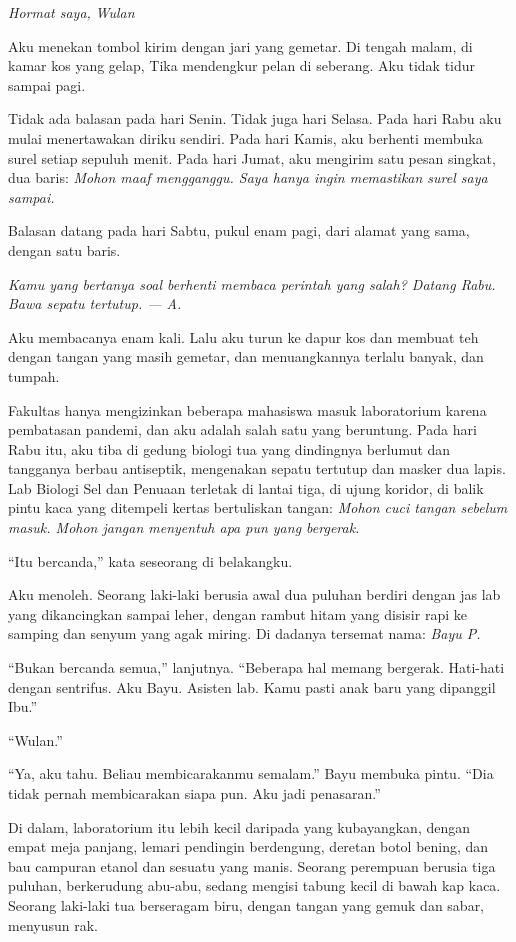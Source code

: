 \documentclass[11pt,twoside,openany]{book}
\makeatletter
\newcommand{\scenebreak}{\par\vspace{0.9em}{\centering\textsc{*\hspace{0.7em}*\hspace{0.7em}*}\par}\vspace{0.9em}\@afterindentfalse\@afterheading}
\makeatother
\begin{document}
\emph{Hormat saya,} \emph{Wulan}

Aku menekan tombol kirim dengan jari yang gemetar. Di tengah malam, di kamar kos yang gelap, Tika mendengkur pelan di seberang. Aku tidak tidur sampai pagi.

Tidak ada balasan pada hari Senin. Tidak juga hari Selasa. Pada hari Rabu aku mulai menertawakan diriku sendiri. Pada hari Kamis, aku berhenti membuka surel setiap sepuluh menit. Pada hari Jumat, aku mengirim satu pesan singkat, dua baris: \emph{Mohon maaf mengganggu. Saya hanya ingin memastikan surel saya sampai.}

Balasan datang pada hari Sabtu, pukul enam pagi, dari alamat yang sama, dengan satu baris.

\emph{Kamu yang bertanya soal berhenti membaca perintah yang salah? Datang Rabu. Bawa sepatu tertutup. --- A.}

Aku membacanya enam kali. Lalu aku turun ke dapur kos dan membuat teh dengan tangan yang masih gemetar, dan menuangkannya terlalu banyak, dan tumpah.

\scenebreak
Fakultas hanya mengizinkan beberapa mahasiswa masuk laboratorium karena pembatasan pandemi, dan aku adalah salah satu yang beruntung. Pada hari Rabu itu, aku tiba di gedung biologi tua yang dindingnya berlumut dan tangganya berbau antiseptik, mengenakan sepatu tertutup dan masker dua lapis. Lab Biologi Sel dan Penuaan terletak di lantai tiga, di ujung koridor, di balik pintu kaca yang ditempeli kertas bertuliskan tangan: \emph{Mohon cuci tangan sebelum masuk. Mohon jangan menyentuh apa pun yang bergerak.}

``Itu bercanda,'' kata seseorang di belakangku.

Aku menoleh. Seorang laki-laki berusia awal dua puluhan berdiri dengan jas lab yang dikancingkan sampai leher, dengan rambut hitam yang disisir rapi ke samping dan senyum yang agak miring. Di dadanya tersemat nama: \emph{Bayu P.}

``Bukan bercanda semua,'' lanjutnya. ``Beberapa hal memang bergerak. Hati-hati dengan sentrifus. Aku Bayu. Asisten lab. Kamu pasti anak baru yang dipanggil Ibu.''

``Wulan.''

``Ya, aku tahu. Beliau membicarakanmu semalam.'' Bayu membuka pintu. ``Dia tidak pernah membicarakan siapa pun. Aku jadi penasaran.''

Di dalam, laboratorium itu lebih kecil daripada yang kubayangkan, dengan empat meja panjang, lemari pendingin berdengung, deretan botol bening, dan bau campuran etanol dan sesuatu yang manis. Seorang perempuan berusia tiga puluhan, berkerudung abu-abu, sedang mengisi tabung kecil di bawah kap kaca. Seorang laki-laki tua berseragam biru, dengan tangan yang gemuk dan sabar, menyusun rak.
\end{document}
